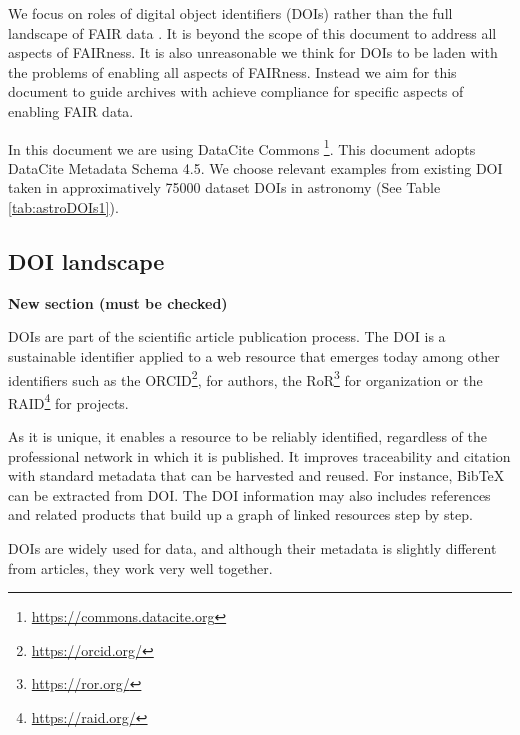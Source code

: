 \documentclass[11pt,a4paper]{ivoa}
\begin{document}
We focus on roles of digital object identifiers (DOIs) rather than the full landscape of FAIR data \citep{Wilkinson2016}. 
It is beyond the scope of this document to address all aspects of FAIRness.
It is also unreasonable we think for DOIs to be laden with the problems of enabling all aspects of FAIRness. 
Instead we aim for this document to guide archives with achieve compliance for specific aspects of enabling FAIR data.


In this document we are using DataCite Commons  \footnote{\url{https://commons.datacite.org}}. This document adopts DataCite Metadata Schema 4.5.
We choose relevant examples from existing DOI taken in approximatively 75000 dataset DOIs in astronomy (See Table \ref{tab:astroDOIs1}). 



\subsection{DOI landscape}
\textbf{\color{red}New section (must be checked)}



DOIs are part of the scientific article publication process. The DOI is a sustainable identifier applied to a web resource that emerges today among other identifiers such  as the ORCID\footnote{\url{https://orcid.org/}}, for authors, the RoR\footnote{\url{https://ror.org/}} for organization or the RAID\footnote{\url{https://raid.org/}} for projects.

As it is unique, it enables a resource to be reliably identified, regardless of the professional network in which it is published. It improves traceability and citation with standard metadata that can be harvested and reused. For instance, BibTeX can be extracted from DOI. The DOI information may also includes references and related products that build up a graph of linked resources step by step.

DOIs are widely used for data, and although their metadata is slightly different from articles, they work very well together.
\end{document}
